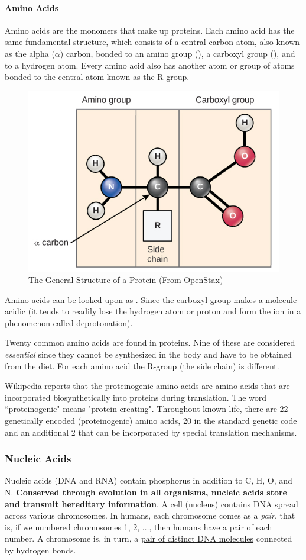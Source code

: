 \paragraph{Amino Acids}
Amino acids are the monomers that make up proteins. Each amino acid has the same fundamental structure, which consists of a central carbon atom, also known as the alpha ($\alpha$) carbon, bonded to an amino group (), a carboxyl group (), and to a hydrogen atom. Every amino acid also has another atom or group of atoms bonded to the central atom known as the R group.

\begin{figure}[h!]
    \centering
    \includegraphics[width=0.5\linewidth]{openstax-protein-general-structure.jpg}
    \caption{The General Structure of a Protein (From OpenStax)}
    \label{fig: protein}
\end{figure}

Amino acids can be looked upon as . Since the carboxyl group makes a molecule acidic (it tends to readily lose the hydrogen atom or proton and form the  ion in a phenomenon called deprotonation).

Twenty common amino acids are found in proteins. Nine of these are considered \emph{essential} since they cannot be synthesized in the body and have to be obtained from the diet. For each amino acid the R-group (the side chain) is different.

Wikipedia reports that the proteinogenic amino acids are amino acids that are incorporated biosynthetically into proteins during translation. The word ``proteinogenic" means "protein creating". Throughout known life, there are 22 genetically encoded (proteinogenic) amino acids, 20 in the standard genetic code and an additional 2 that can be incorporated by special translation mechanisms.

\subsubsection{Nucleic Acids}
Nucleic acids (DNA and RNA) contain phosphorus in addition to C, H, O, and N. \textbf{Conserved through evolution in all organisms, nucleic acids store and transmit hereditary information}. A cell (nucleus) contains DNA spread across various chromosomes. In humans, each chromosome comes as a \emph{pair}, that is, if we numbered chromosomes 1, 2, $\dots$, then humans have a pair of each number. A chromosome is, in turn, a \href{https://biology.stackexchange.com/a/996/63085}{pair of distinct DNA molecules} connected by hydrogen bonds.


